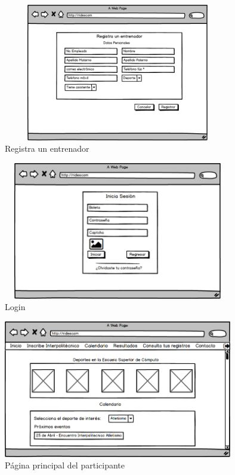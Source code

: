 		\begin{figure}[hbt!]
			\centering
			\includegraphics[width=10cm, height=6cm]{Imagenes/Disenos/p12Registroentrenador.png}
			\caption{Registra un entrenador}
			\label{Registroentrenador}
		\end{figure}
			\pagebreak
	
		\begin{figure}[hbt!]
			\centering
			\includegraphics[width=10cm, height=6cm]{Imagenes/Disenos/p1Login.png}
			\caption{Login}
			\label{Login}
		\end{figure}
	
		\begin{figure}[hbt!]
			\centering
			\includegraphics[width=10cm, height=6cm]{Imagenes/Disenos/p13Iniciopaticipante.png}
			\caption{Página principal del participante}
			\label{Inicioparticipante}
		\end{figure}	
	
